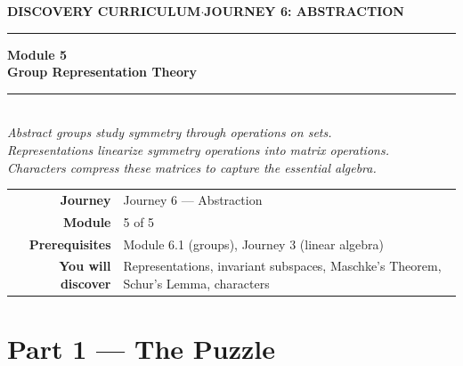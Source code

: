 \documentclass[12pt, a4paper]{article}
\begin{document}
\thispagestyle{empty}
\begin{center}
{\small\color{ModuleColor}\textbf{DISCOVERY CURRICULUM}\quad$\cdot$\quad\textbf{JOURNEY 6: ABSTRACTION}}
\vspace{0.6cm}

{\color{NavyBlue}\rule{\linewidth}{2.5pt}}\vspace{0.5cm}

{\Huge\bfseries\color{NavyBlue}Module 5}\\[0.3cm]
{\LARGE\bfseries\color{ModuleColor}Group Representation Theory}\\[0.4cm]
{\color{PuzzleColor}\rule{0.4\linewidth}{1.5pt}}\\[0.4cm]
{\large\itshape\color{NavyBlue!80}
Abstract groups study symmetry through operations on sets.\\[0.15cm]
Representations linearize symmetry operations into matrix operations.\\[0.15cm]
Characters compress these matrices to capture the essential algebra.}

\vspace{1.4cm}
\begin{tabular}{rl}
\textbf{Journey}         & Journey 6 --- Abstraction \\[4pt]
\textbf{Module}          & 5 of 5 \\[4pt]
\textbf{Prerequisites}   & Module 6.1 (groups), Journey 3 (linear algebra) \\[4pt]
\textbf{You will discover} & Representations, invariant subspaces, Maschke's Theorem, Schur's Lemma, characters \\[4pt]
\end{tabular}
\end{center}

\newpage

\section{Part 1 --- The Puzzle}
\end{document}
